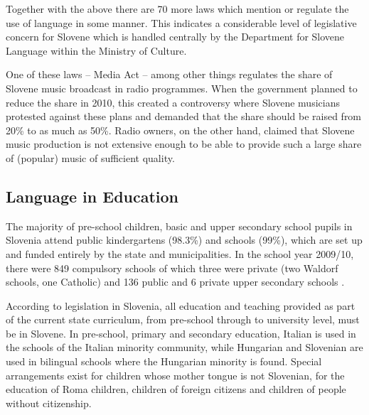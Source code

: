 \begin{multicols}{2}
Together with the above there are 70 more laws which mention or regulate the use of language in some manner. This indicates a considerable level of legislative concern for Slovene which is handled centrally by the Department for Slovene Language within the Ministry of Culture.


One of these laws – Media Act – among other things regulates the share of Slovene music broadcast in radio programmes. When the government planned to reduce the share in 2010, this created a controversy where Slovene musicians protested against these plans and demanded that the share should be raised from 20\% to as much as 50\%. Radio owners, on the other hand, claimed that Slovene music production is not extensive enough to be able to provide such a large share of (popular) music of sufficient quality.

\subsection{Language in Education}

The majority of pre-school children, basic and upper secondary school pupils in Slovenia attend public kindergartens (98.3\%) and schools (99\%), which are set up and funded entirely by the state and municipalities. In the school year 2009/10, there were 849 compulsory schools of which three were private (two Waldorf schools, one Catholic) and 136 public and 6 private upper secondary schools \cite{Eurydice1}.


According to legislation in Slovenia, all education and teaching provided as part of the current state curriculum, from pre-school through to university level, must be in Slovene. In pre-school, primary and secondary education, Italian is used in the schools of the Italian minority community, while Hungarian and Slovenian are used in bilingual schools where the Hungarian minority is found. Special arrangements exist for children whose mother tongue is not Slovenian, for the education of Roma children, children of foreign citizens and children of people without citizenship.


\end{multicols}
